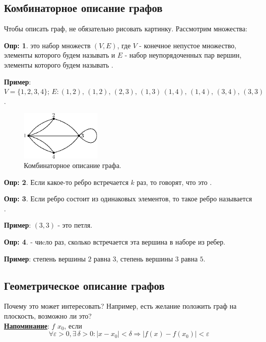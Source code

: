 \documentclass[12pt]{article}
\newcommand{\VE}{\varepsilon}
\theoremstyle{definition}
\newtheorem{defn}{Опр:}
\begin{document}
\subsection*{Комбинаторное описание графов}
Чтобы описать граф, не обязательно рисовать картинку. Рассмотрим множества:

\begin{defn}
	 это набор множеств $(V,E)$, где $V$ - конечное непустое множество, элементы которого будем называть  и $E$ - набор неупорядоченных пар вершин, элементы которого будем называть .
\end{defn}

\textbf{Пример}: $V = \{1,2,3,4\}; \, E: (1,2),\, (1,2),\,(2,3),\,(1,3)\,(1,4),\,(1,4),\,(3,4), \, (3,3)$.

\begin{figure}[H]
	\centering
	\includegraphics[width=0.35\textwidth]{1_4.eps}
	\caption{Комбинаторное описание графа.}
	\label{1_4}
\end{figure}

\begin{defn}
	Если какое-то ребро встречается $k$ раз, то говорят, что это .
\end{defn}

\begin{defn}
	Если ребро состоит из одинаковых элементов, то такое ребро называется .
\end{defn}

\textbf{Пример}: $(3,3)$ - это петля.

\begin{defn}
	 - чиcло раз, сколько встречается эта вершина в наборе из ребер.
\end{defn}

\textbf{Пример}: степень вершины $2$ равна $3$, степень вершины $3$ равна $5$.

\subsection*{Геометрическое описание графов}
Почему это может интересовать? Например, есть желание положить граф на плоскость, возможно ли это?\\
\textbf{\uline{Напоминание}}: $f$  $x_0$, если 
$$\forall \VE > 0, \exists \, \delta > 0 \colon |x - x_0| < \delta \Rightarrow |f(x) - f(x_0)| < \VE$$
\end{document}

